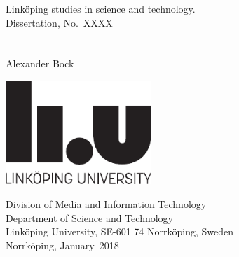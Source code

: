 \setbirthplace{~}
\phden
{}

\def\fronttitleM{\thesistitle}
\def\fronttitleS{~}
\renewcommand{\author}{\thesisauthor} %
\newcommand{\thesismonth}{January}
\newcommand{\thesisyear}{2018}
\newcommand{\thesisno}{XXXX}
\newcommand{\isbn}{ISBN: XXXX}
\newcommand{\issn}{ISSN: XXXX}


\thispagestyle{empty}

\makeatletter
\begin{center}
  \large Link{\"o}ping studies in science and technology.\\
  Dissertation, No.\ \thesisno\\[8 mm]
  {\large \MakeUppercase{\fronttitleM}}\\[1 mm]
  {\large \textit{\fronttitleS}}\\[8 mm]
  {\large Alexander Bock}\\[1 cm]
\end{center}
\vfill \vspace{2cm}
\centerline{\includegraphics[width=5.5cm]{figures/logo/linkuniv_staende_eng}}
\vfill
\begin{center}
\end{center}
\vfill
\begin{center}
  Division of Media and Information Technology\\
  Department of Science and Technology\\
  Link{\"o}ping University, SE-601 74 Norrk{\"o}ping, Sweden\\[0mm]
  Norrk{\"o}ping, \thesismonth~\thesisyear
\end{center}

\clearpage